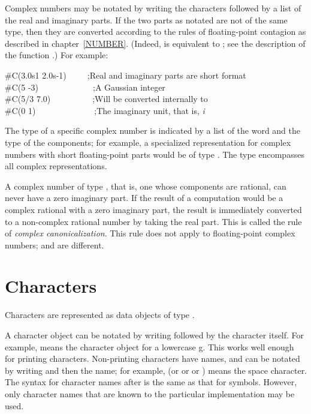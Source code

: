 Complex numbers may be notated by writing the characters 
followed by a list of the real and imaginary parts.
If the two parts as notated are not of the same type, then
they are converted according to the rules of floating-point contagion
as described in chapter~\ref{NUMBER}.
(Indeed,  is equivalent to ;
see the description of the function .)
For example:
\begin{lisp}
\#C(3.0s1 2.0s-1)~~~~~;\textrm{Real and imaginary parts are short format}\\
\#C(5 -3)~~~~~~~~~~~~~;\textrm{A Gaussian integer} \\
\#C(5/3 7.0)~~~~~~~~~~;\textrm{Will be converted internally to } \\
\#C(0 1)~~~~~~~~~~~~~~;\textrm{The imaginary unit, that is, \emph{i}}
\end{lisp}

The type of a specific complex number is indicated by a list
of the word  and the type of the components; for example,
a specialized representation for complex numbers with short floating-point
parts would be of type .  The type 
encompasses all complex representations.

A complex number of type , that is, one whose
components are rational, can never have a zero imaginary part.
If the result of a computation would be a complex rational
with a zero imaginary part, the result is immediately
converted to a non-complex rational number by taking the
real part.  This is called the rule of \emph{complex canonicalization}.
This rule does not apply to floating-point complex numbers;
 and  are different.

\section{Characters}

Characters are represented as data objects of type .

A character object can be notated by writing \cd{\#{\Xbackslash}} followed
by the character itself.  For example,  means the character
object for a lowercase g.  This works well enough for printing
characters.  Non-printing characters have names, and can be notated
by writing \cd{\#{\Xbackslash}} and then the name; for example, 
(or  or  or )
means the space character.  The syntax for character names after \cd{\#{\Xbackslash}}
is the same as that for symbols.  However, only character names
that are known to the particular implementation may be used.

